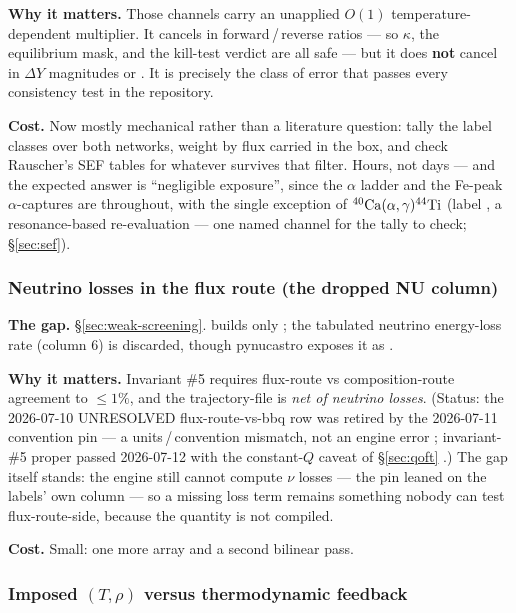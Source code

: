 \textbf{Why it matters.} Those channels carry an unapplied $O(1)$
temperature-dependent multiplier. It cancels in forward\,/\,reverse ratios ---
so $\kappa$, the equilibrium mask, and the kill-test verdict are all safe ---
but it does \textbf{not} cancel in $\Delta Y$ magnitudes or \enuc. It is
precisely the class of error that passes every consistency test in the
repository.

\textbf{Cost.} Now mostly mechanical rather than a literature question: tally
the label classes over both networks, weight by flux carried in the box, and
check Rauscher's SEF tables \citep{rauscher2000} for whatever survives that
filter. Hours, not days --- and the expected answer is ``negligible exposure'',
since the $\alpha$ ladder and the Fe-peak $\alpha$-captures are 
throughout, with the single exception of
$\nuc{Ca}{40}(\alpha,\gamma)\nuc{Ti}{44}$ (label , a resonance-based
re-evaluation --- one named channel for the tally to check;
\S\ref{sec:sef}).

\subsubsection{Neutrino losses in the flux route (the dropped NU column)}
\label{sec:gap-nu}

\textbf{The gap.} \S\ref{sec:weak-screening}.  builds only
; the tabulated neutrino energy-loss rate (column 6) is
discarded, though pynucastro exposes it as .

\textbf{Why it matters.} Invariant \#5 requires flux-route vs
composition-route \enuc{} agreement to $\le1\%$, and the trajectory-file
 is \emph{net of neutrino losses}. (Status: the 2026-07-10
UNRESOLVED flux-route-vs-bbq row was retired by the 2026-07-11 
convention pin --- a units\,/\,convention mismatch, not an engine error
; invariant-\#5 proper passed 2026-07-12 with the
constant-$Q$ caveat of \S\ref{sec:qoft} .) The gap itself
stands: the engine still cannot compute $\nu$ losses --- the pin leaned on the
labels' own  column --- so a missing loss term remains something
nobody can test flux-route-side, because the quantity is not compiled.

\textbf{Cost.} Small: one more  array and a second bilinear pass.

\subsubsection{Imposed \texorpdfstring{$(T, \rho)$}{(T, rho)} versus thermodynamic feedback}
\label{sec:gap-feedback}

